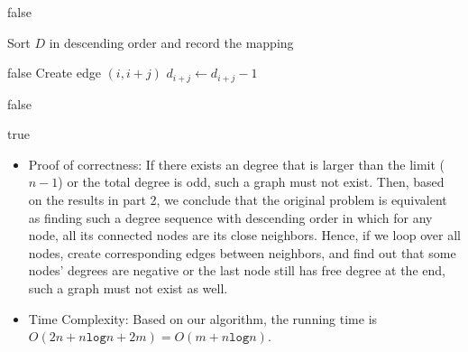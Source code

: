 \documentclass{article} %
\begin{document}
\begin{enumerate}
\begin{algorithm}
\begin{algorithmic}[1]
     \Return false
    \EndIf

    \State Sort $D$ in descending order and record the mapping

       \Return false
      \EndIf
          \State Create edge $(i,i+j)$
          \State $d_{i+j} \gets d_{i+j} - 1$
      \EndFor
    \EndFor

	 \Return false
	\EndIf

    \State \Return true
    \EndFunction
    \end{algorithmic}
	\end{algorithm}
    
    \begin{itemize}
	\item Proof of correctness: If there exists an degree that is larger than the limit ($n-1$) or the total degree is odd, such a graph must not exist. Then, based on the results in part 2, we conclude that the original problem is equivalent as finding such a degree sequence with descending order in which for any node,  all its connected nodes are its close neighbors. Hence, if we loop over all nodes, create corresponding edges between neighbors, and find out that some nodes' degrees are negative or the last node still has free degree at the end, such a graph must not exist as well.
    \item Time Complexity: Based on our algorithm, the running time is $O(2n + n\mathtt{log}n + 2m) = O(m+n\mathtt{log}n).$
	\end{itemize}

\end{enumerate}

\newpage
\end{document}
